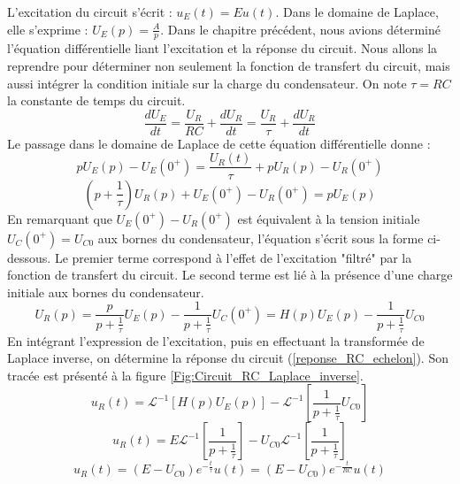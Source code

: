 	L'excitation du circuit s'écrit : $u_{E}(t)=Eu(t)$. Dans le domaine de Laplace, elle s'exprime : $U_{E}(p)=\frac{A}{p}$.
	Dans le chapitre précédent, nous avions déterminé l'équation différentielle liant l'excitation et la réponse du circuit. Nous allons la reprendre pour déterminer non seulement la fonction de transfert du circuit, mais aussi intégrer la condition initiale sur la charge du condensateur. On note $\tau=RC$ la constante de temps du circuit.
	\begin{equation}\label{}
	\frac{dU_{E}}{dt}=\frac{U_{R}}{RC}+\frac{dU_{R}}{dt}=\frac{U_{R}}{\tau}+\frac{dU_{R}}{dt}
	\end{equation}
	Le passage dans le domaine de Laplace de cette équation différentielle donne :
	\begin{equation*}
	pU_{E}(p)-U_{E}(0^{+})=\frac{U_{R}(t)}{\tau}+pU_{R}(p)-U_{R}(0^{+})
	\end{equation*}
	\begin{equation*}
	(p+\frac{1}{\tau})U_{R}(p)+U_{E}(0^{+})-U_{R}(0^{+})=pU_{E}(p)
	\end{equation*}
	En remarquant que $U_{E}(0^{+})-U_{R}(0^{+})$ est équivalent à la tension initiale $U_{C}(0^{+})=U_{C0}$ aux bornes du condensateur, l'équation s'écrit sous la forme ci-dessous. Le premier terme correspond à l'effet de l'excitation "filtré" par la fonction de transfert du circuit. Le second terme est lié à la présence d'une charge initiale aux bornes du condensateur.
	\begin{equation*}
	U_{R}(p) = \frac{p}{p+\frac{1}{\tau}}U_{E}(p)-\frac{1}{p+\frac{1}{\tau}}U_{C}(0^{+})=H(p)U_{E}(p)-\frac{1}{p+\frac{1}{\tau}}U_{C0}
	\end{equation*} 
	En intégrant l'expression de l'excitation, puis en effectuant la transformée de Laplace inverse, on détermine la réponse du circuit (\ref{reponse_RC_echelon}). Son tracée est présenté à la figure \ref{Fig:Circuit_RC_Laplace_inverse}.
	\begin{equation*}
	u_{R}(t)=\mathcal{L}^{-1}[H(p)U_{E}(p)]-\mathcal{L}^{-1}[\frac{1}{p+\frac{1}{\tau}}U_{C0}]
	\end{equation*}
	\begin{equation*}
	u_{R}(t)=E\mathcal{L}^{-1}[\frac{1}{p+\frac{1}{\tau}}]-U_{C0}\mathcal{L}^{-1}[\frac{1}{p+\frac{1}{\tau}}]
	\end{equation*}
	\begin{equation}\label{reponse_RC_echelon}
	u_{R}(t)=(E-U_{C0})e^{-\frac{t}{\tau}}u(t)=(E-U_{C0})e^{-\frac{t}{RC}}u(t)
	\end{equation}
	
